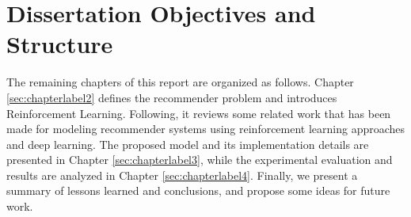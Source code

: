\section{Dissertation Objectives and Structure}

The remaining chapters of this report are organized as follows. Chapter \ref{sec:chapterlabel2} defines the recommender problem and introduces Reinforcement Learning. Following, it reviews some related work that has been made for modeling recommender systems using reinforcement learning approaches and deep learning. The proposed model and its implementation details are presented in Chapter \ref{sec:chapterlabel3}, while the experimental evaluation and results are analyzed in Chapter \ref{sec:chapterlabel4}. Finally, we present a summary of lessons learned and conclusions, and propose some ideas for future work.


